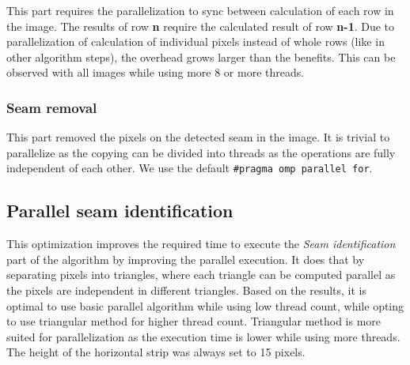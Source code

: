 \documentclass{article}
\begin{document}
This part requires the parallelization to sync between calculation of each row in the image. The results of row \textbf{n} require the calculated result of row \textbf{n-1}. Due to parallelization of calculation of individual pixels instead of whole rows (like in other algorithm steps), the overhead grows larger than the benefits. This can be observed with all images while using more 8 or more threads.

\subsubsection{Seam removal}
This part removed the pixels on the detected seam in the image. It is trivial to parallelize as the copying can be divided into threads as the operations are fully independent of each other. We use the default \texttt{\#pragma omp parallel for}.

\subsection{Parallel seam identification}
This optimization improves the required time to execute the \textit{Seam identification} part of the algorithm by improving the parallel execution. It does that by separating pixels into triangles, where each triangle can be computed parallel as the pixels are independent in different triangles. Based on the results, it is optimal to use basic parallel algorithm while using low thread count, while opting to use triangular method for higher thread count. Triangular method is more suited for parallelization as the execution time is lower while using more threads. The height of the horizontal strip was always set to 15 pixels.
\end{document}
